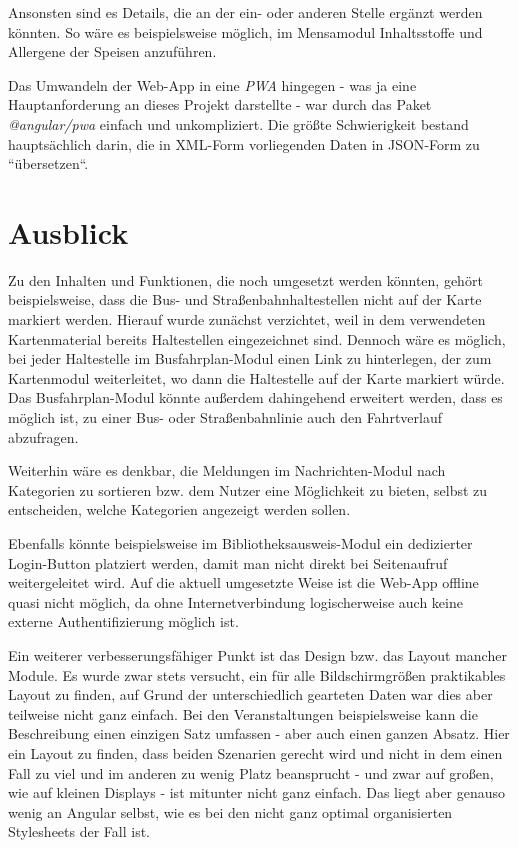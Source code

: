 Ansonsten sind es Details, die an der ein- oder anderen Stelle ergänzt werden könnten. So wäre es beispielsweise möglich, im Mensamodul Inhaltsstoffe und Allergene der Speisen anzuführen.

Das Umwandeln der Web-App in eine \textit{\acl{PWA}} hingegen - was ja eine Hauptanforderung an dieses Projekt darstellte - war durch das Paket \textit{@angular/pwa} einfach und unkompliziert. Die größte Schwierigkeit bestand hauptsächlich darin, die in \acs{XML}-Form vorliegenden Daten in \acs{JSON}-Form zu ``übersetzen``.

\section{Ausblick}
\label{sec:conclusion:future}
Zu den Inhalten und Funktionen, die noch umgesetzt werden könnten, gehört beispielsweise, dass die Bus- und Straßenbahnhaltestellen nicht auf der Karte markiert werden. Hierauf wurde zunächst verzichtet, weil in dem verwendeten Kartenmaterial bereits Haltestellen eingezeichnet sind. Dennoch wäre es möglich, bei jeder Haltestelle im Busfahrplan-Modul einen Link zu hinterlegen, der zum Kartenmodul weiterleitet, wo dann die Haltestelle auf der Karte markiert würde. Das Busfahrplan-Modul könnte außerdem dahingehend erweitert werden, dass es möglich ist, zu einer Bus- oder Straßenbahnlinie auch den Fahrtverlauf abzufragen.

Weiterhin wäre es denkbar, die Meldungen im Nachrichten-Modul nach Kategorien zu sortieren bzw. dem Nutzer eine Möglichkeit zu bieten, selbst zu entscheiden, welche Kategorien angezeigt werden sollen.

Ebenfalls könnte beispielsweise im Bibliotheksausweis-Modul ein dedizierter Login-Button platziert werden, damit man nicht direkt bei Seitenaufruf weitergeleitet wird. Auf die aktuell umgesetzte Weise ist die Web-App offline quasi nicht möglich, da ohne Internetverbindung logischerweise auch keine externe Authentifizierung möglich ist.

Ein weiterer verbesserungsfähiger Punkt ist das Design bzw. das Layout mancher Module. Es wurde zwar stets versucht, ein für alle Bildschirmgrößen praktikables Layout zu finden, auf Grund der unterschiedlich gearteten Daten war dies aber teilweise nicht ganz einfach. Bei den Veranstaltungen beispielsweise kann die Beschreibung einen einzigen Satz umfassen - aber auch einen ganzen Absatz. Hier ein Layout zu finden, dass beiden Szenarien gerecht wird und nicht in dem einen Fall zu viel und im anderen zu wenig Platz beansprucht - und zwar auf großen, wie auf kleinen Displays - ist mitunter nicht ganz einfach. Das liegt aber genauso wenig an Angular selbst, wie es bei den nicht ganz optimal organisierten Stylesheets der Fall ist.

